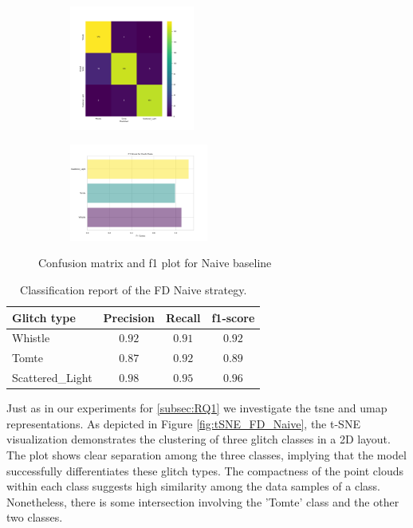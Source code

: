 \begin{figure}[H]
\centering
\begin{subfigure}
  \centering
  \includegraphics[width=0.45\textwidth]{Images/cm_FD_model_naive.png}  
  \label{fig:fd_sub-first}
\end{subfigure}
\begin{subfigure}
  \centering
  \includegraphics[width=0.50\textwidth]{Images/f1_FD_model_naive.png}  
  \label{fig:fd_sub-second}
\end{subfigure}
\caption{Confusion matrix and f1 plot for Naive baseline}
\label{fig:cm_f1_FD_naive_baseline}
\end{figure}

\begin{table}[ht]
\centering
    \begin{tabular}{|l|c c c|}
    \hline
    \textbf{Glitch type} & \textbf{Precision} & \textbf{Recall} & \textbf{f1-score} \\ \hline
    Whistle & $0.92$ & $0.91$ & $0.92$ \\
    Tomte & $0.87$ & $0.92$ & $0.89$ \\
    Scattered\_Light & $0.98$ & $0.95$ & $0.96$ \\
    \hline
    \end{tabular}
    \caption{Classification report of the FD Naive strategy.}
    \label{tbl:RQ2_class_report_FD_Naive}
\end{table}

Just as in our experiments for \ref{subsec:RQ1} we investigate the \acrshort{tsne} and \acrshort{umap} representations. 
As depicted in Figure \ref{fig:tSNE_FD_Naive}, the t-SNE visualization demonstrates the clustering of three glitch classes in a 2D layout. The plot shows clear separation among the three classes, implying that the model successfully differentiates these glitch types. The compactness of the point clouds within each class suggests high similarity among the data samples of a class. Nonetheless, there is some intersection involving the 'Tomte' class and the other two classes.\\

